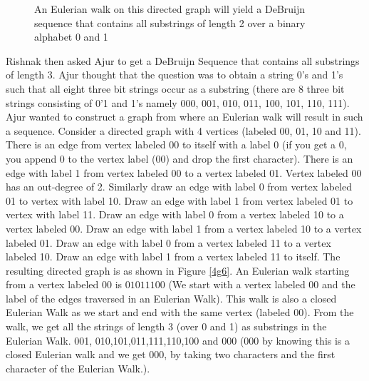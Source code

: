 \begin{figure}
\begin{center}
\caption{ An Eulerian walk on this directed graph will yield a DeBruijn sequence that contains  all substrings of length 2 over a binary alphabet 0 and 1}\label{4g55}
\end{center}
\end{figure}
Rishnak then asked Ajur to get a DeBruijn Sequence that contains all substrings of length 3.
Ajur thought that the question was to obtain a string 0's and 1's such that all eight three bit strings occur as a substring (there are 8 three bit strings consisting of 0'1 and 1's namely 000, 001, 010, 011, 100, 101, 110, 111). Ajur wanted to construct a graph from where an Eulerian walk will result in such a sequence.  Consider a directed graph with 4 vertices (labeled 00, 01, 10 and 11).
There is an edge from vertex labeled 00 to itself with a label 0 (if you get a 0, you append 0 to the vertex label (00) and drop the first character). There is an edge with label 1 from
vertex labeled 00 to a vertex labeled 01. Vertex labeled 00 has an out-degree of 2. Similarly draw an edge with label 0 from vertex labeled 01 to vertex with label 10. Draw an edge with label 1 from vertex labeled 01 to vertex with label 11. 
Draw an edge with label 0 from a  vertex labeled 10 to a vertex labeled 00. Draw an edge with label 1 from a vertex labeled 10 to a vertex labeled 01.
Draw an edge with label 0 from a vertex labeled 11 to a vertex labeled 10. Draw an edge with label 1 from a vertex labeled 11 to itself.
The resulting directed graph is as shown in Figure \ref{4g6}. An Eulerian walk starting from a vertex labeled 00 is $0 1 0 1 1 1 0 0$  (We start with a vertex labeled 00 and the label of the edges traversed in an Eulerian Walk). This walk is also a closed Eulerian Walk as we start and end with the same vertex (labeled $00$).
From the walk, we get all the strings of length 3 (over 0 and 1) as substrings in the Eulerian Walk.
001, 010,101,011,111,110,100 and 000 (000 by knowing this is a closed Eulerian walk and we get 000, by taking two characters and the first character of the Eulerian Walk.).\\
